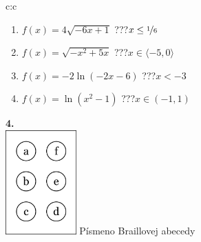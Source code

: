 \documentclass[10pt]{report}
\begin{document}
\begin{tabular}{c:c}
\begin{minipage}[c][99mm][t]{0.49\linewidth}
\begin{center}
\begin{minipage}{0.77\linewidth}
\begin{center}
\begin{varwidth}{\textwidth}
\begin{enumerate}
\item $f(x)=4\sqrt{-6x+1}$\quad \dotfill\; ???\;\dotfill \quad $x\leq\nicefrac{1}{6}$
\item $f(x)=\sqrt{-x^2+5x}$\quad \dotfill\; ???\;\dotfill \quad $x\in\langle-5 , 0\rangle$
\item $f(x)=-2\ln{(-2x-6)}$\quad \dotfill\; ???\;\dotfill \quad $x<-3$
\item $f(x)=\ln{(x^2-1)}$\quad \dotfill\; ???\;\dotfill \quad $x\in(-1 , 1)$
\end{enumerate}
\end{varwidth}
\end{center}
\end{minipage}
\begin{minipage}{0.20\linewidth}
\begin{center}
{\Huge\bfseries 4.} \\[2mm]
\includegraphics[height=40mm]{../images/braille.png}
{\small Písmeno Braillovej abecedy}
\end{center}
\end{minipage}
\end{center}
\end{minipage}
%
\end{tabular}
\newpage
\thispagestyle{empty}
\end{document}

